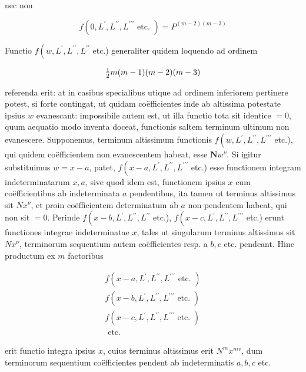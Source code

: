 \documentclass[twoside,12pt, showframe]{memoir}
\let\oldfrac\frac
\def\frac#1#2{\mathchoice{\tfrac{#1}{#2}}{\oldfrac{#1}{#2}}{\genfrac{}{}{}{2}{#1}{#2\mathstrut}}{\genfrac{}{}{}{3}{#1}{#2\mathstrut}}}
\begin{document}
nec non

\[
f\left(0, L^{\prime}, L^{\prime \prime}, L^{\prime \prime \prime} \text { etc. }\right)=P^{(m-2)(m-3)}
\]

Functio \(f\left(w, L^{\prime}, L^{\prime \prime}, L^{\prime \prime}\right.\) etc.) generaliter quidem loquendo ad ordinem

\[
\frac{1}{2} m(m-1)(m-2)(m-3)
\]

referenda erit: at in casibus specialibus utique ad ordinem inferiorem pertinere potest, si forte contingat, ut quidam coëfficientes inde ab altissima potestate ipsius \(w\) evanescant: impossibile autem est, ut illa functio tota sit identice \(=0\), quum
aequatio modo inventa doceat, functionis saltem terminum ultimum non evanescere. Supponemus, terminum altissimum functionis \(f\left(w, L^{\prime}, L^{\prime \prime}, L^{\prime \prime \prime}\right.\) etc.), qui quidem coëfficientem non evanescentem habeat, esse \(\boldsymbol{N} w^{\nu}\). Si igitur substituimus \(w=x-a\), patet, \(f\left(x-a, L^{\prime}, L^{\prime \prime}, L^{\prime \prime \prime}\right.\) etc.) esse functionem integram indeterminatarum \(x, a\), sive quod idem est, functionem ipsius \(x\) cum coëfficientibus ab indeterminata \(a\) pendentibus, ita tamen ut terminus altissimus sit \(N x^{\nu}\), et proin coëfficientem determinatum ab \(a\) non pendentem habeat, qui non sit \(=0\). Perinde \(f\left(x-b, L^{\prime}, L^{\prime \prime}, L^{\prime \prime}\right.\) etc.), \(f\left(x-c, L^{\prime}, L^{\prime \prime}, L^{\prime \prime \prime}\right.\) etc.) erunt functiones integrae indeterminatae \(x\), tales ut singularum terminus altissimus sit \(N x^{\nu}\), terminorum sequentium autem coëfficientes resp. a \(b, c\) etc. pendeant. Hinc productum ex \(m\) factoribus

\[
\begin{gathered}
f\left(x-a, L^{\prime}, L^{\prime \prime}, L^{\prime \prime \prime} \text { etc. }\right) \\
f\left(x-b, L^{\prime}, L^{\prime \prime}, L^{\prime \prime \prime} \text { etc. }\right) \\
f\left(x-c, L^{\prime}, L^{\prime \prime}, L^{\prime \prime \prime} \text { etc. }\right) \\
\text { etc. }
\end{gathered}
\]

erit functio integra ipsius \(x\), cuius terminus altissimus erit \(N^{m} x^{m v}\), dum terminorum sequentium coëfficientes pendent ab indeterminatis \(a, b, c\) etc.
\end{document}

